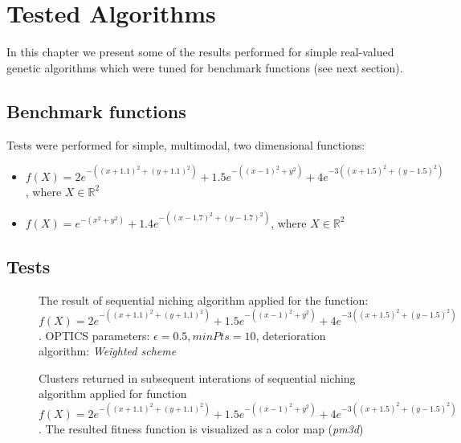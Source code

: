 
\chapter{Tested Algorithms}
\label{TestedAlgorithms}
In this chapter we present some of the results performed for simple
real-valued genetic algorithms which were tuned for benchmark
functions (see next section).

\section{Benchmark functions}
Tests were performed for simple, multimodal, two dimensional functions:
\begin{itemize}
  \item $f(X) = 2e^{-((x+1.1)^2 + (y+1.1)^2)} + 1.5e^{-((x-1)^2 + y^2)} +
  4e^{-3((x+1.5)^2 + (y-1.5)^2)}$, where $X \in \mathbb{R}^2$
  \item $f(X) = e^{-(x^2 + y^2)}+1.4e^{-((x-1.7)^2 + (y-1.7)^2)}$, where $X \in
  \mathbb{R}^2$
\end{itemize} 

\section{Tests}
\begin{figure}
  \centering
  \caption{The result of sequential niching algorithm applied for the function:
  $f(X) = 2e^{-((x+1.1)^2 + (y+1.1)^2)} + 1.5e^{-((x-1)^2 + y^2)} +
  4e^{-3((x+1.5)^2 + (y-1.5)^2)}$. OPTICS parameters: $\epsilon=0.5,
  minPts=10$, deterioration algorithm: \textit{Weighted scheme}}
  \label{seqNiching1}
\end{figure}

\begin{figure}
  \centering
  \caption{Clusters returned in subsequent interations of sequential
  niching algorithm applied for function
  $f(X) = 2e^{-((x+1.1)^2 + (y+1.1)^2)} + 1.5e^{-((x-1)^2 + y^2)} +
  4e^{-3((x+1.5)^2 + (y-1.5)^2)}$. The resulted fitness function is visualized 
  as a color map (\textit{pm3d})}
  \label{seqNichingPop}
\end{figure}

